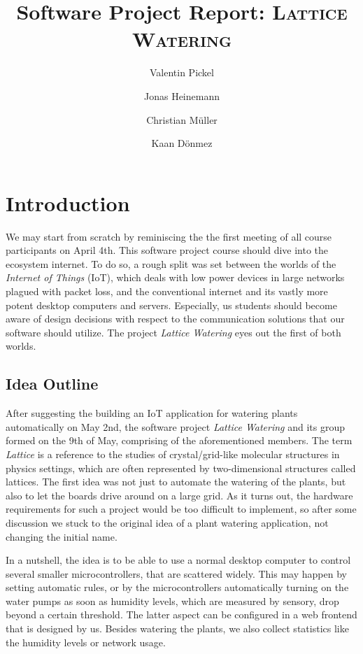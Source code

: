 \documentclass[acmtog, language=english, nonacm]{acmart}
\title{Software Project Report: \textsc{Lattice Watering}}
\author{Valentin Pickel}
\author{Jonas Heinemann}
\author{Christian Müller}
\author{Kaan Dönmez}
\affiliation{%
    \department[0]{Institute for Computer Science}%
    \institution{Freie Universität Berlin}%
    \city{Berlin}%
    \country{Germany}}
\begin{document}
    \maketitle

    \section{Introduction}

    We may start from scratch by reminiscing the the first meeting of all course participants on April 4th. This software project course should dive into the ecosystem internet. To do so, a rough split was set between the worlds of the \emph{Internet of Things} (IoT), which deals with low power devices in large networks plagued with packet loss, and the conventional internet and its vastly more potent desktop computers and servers. Especially, us students should become aware of design decisions with respect to the communication solutions that our software should utilize. The project \emph{Lattice Watering} eyes out the first of both worlds.

    \subsection{Idea Outline}

    After suggesting the building an IoT application for watering plants automatically on May 2nd, the software project \emph{Lattice Watering} and its group formed on the 9th of May, comprising of the aforementioned members. The term \emph{Lattice} is a reference to the studies of crystal/grid-like molecular structures in physics settings, which are often represented by two-dimensional structures called lattices. The first idea was not just to automate the watering of the plants, but also to let the boards drive around on a large grid. As it turns out, the hardware requirements for such a project would be too difficult to implement, so after some discussion we stuck to the original idea of a plant watering application, not changing the initial name.

    In a nutshell, the idea is to be able to use a normal desktop computer to control several smaller microcontrollers, that are scattered widely. This may happen by setting automatic rules, or by the microcontrollers automatically turning on the water pumps as soon as humidity levels, which are measured by sensory, drop beyond a certain threshold. The latter aspect can be configured in a web frontend that is designed by us. Besides watering the plants, we also collect statistics like the humidity levels or network usage.
\end{document}
